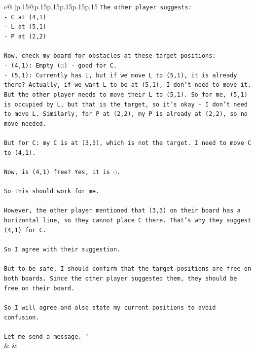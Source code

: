 \documentclass{article}
\begin{document}
{\begin{supertabular}{c@{$\;$}|p{.15\linewidth}@{}p{.15\linewidth}p{.15\linewidth}p{.15\linewidth}p{.15\linewidth}p{.15\linewidth}}
{{{\texttt{The other player suggests:} \\
\texttt{{-} C at (4,1)} \\
\texttt{{-} L at (5,1)} \\
\texttt{{-} P at (2,2)} \\
\\ 
\texttt{Now, check my board for obstacles at these target positions:} \\
\texttt{{-} (4,1): Empty (◌) {-} good for C.} \\
\texttt{{-} (5,1): Currently has L, but if we move L to (5,1), it is already there? Actually, if we want L to be at (5,1), I don't need to move it. But the other player needs to move their L to (5,1). So for me, (5,1) is occupied by L, but that is the target, so it's okay {-} I don't need to move L. Similarly, for P at (2,2), my P is already at (2,2), so no move needed.} \\
\\ 
\texttt{But for C: my C is at (3,3), which is not the target. I need to move C to (4,1).} \\
\\ 
\texttt{Now, is (4,1) free? Yes, it is ◌.} \\
\\ 
\texttt{So this should work for me.} \\
\\ 
\texttt{However, the other player mentioned that (3,3) on their board has a horizontal line, so they cannot place C there. That's why they suggest (4,1) for C.} \\
\\ 
\texttt{So I agree with their suggestion.} \\
\\ 
\texttt{But to be safe, I should confirm that the target positions are free on both boards. Since the other player suggested them, they should be free on their board.} \\
\\ 
\texttt{So I will agree and also state my current positions to avoid confusion.} \\
\\ 
\texttt{Let me send a message.      '} \\
            }
        }
    }
    & & \\ \\


\end{supertabular}}
\end{document}
